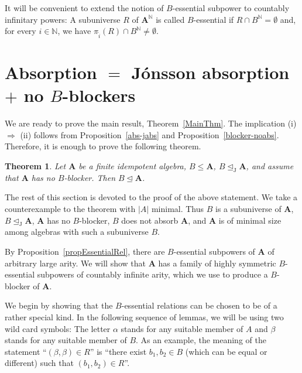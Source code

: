\documentclass{amsart}
\theoremstyle{plain}
\newtheorem{theorem}{Theorem}
\theoremstyle{definition}
\begin{document}
It will be convenient to extend the notion of $B$-essential subpower to countably infinitary powers:  A subuniverse $R$ of ${{\mathbf{A}}}^{{\mathbb N}}$ is called $B$-essential if $R\cap B^{{\mathbb N}}=\emptyset$ and, for every $i \in {{\mathbb N}}$, 
we have $\pi_{\widehat i} (R)\cap B^{{\mathbb N}}\neq \emptyset$. 

\section{Absorption $=$ J\'onsson absorption $+$ no $B$-blockers}

We are ready to prove the main result, Theorem~\ref{MainThm}.
The implication (i) $\Rightarrow$ (ii) follows from Proposition~\ref{abs-jabs} and Proposition~\ref{blocker-noabs}.
Therefore, it is enough to prove the following theorem. 

\begin{theorem}\label{thmAbsChar}
Let ${{\mathbf{A}}}$ be a finite idempotent algebra, $B\leq {{\mathbf{A}}}$, $B\operatorname{\trianglelefteq_J} {{\mathbf{A}}}$, and assume that ${{\mathbf{A}}}$ has no $B$-blocker. Then $B\operatorname{\trianglelefteq} {{\mathbf{A}}}$.
\end{theorem}
The rest of this section is devoted to the proof of the above statement. We take a counterexample to the theorem with $|A|$ minimal.
Thus $B$ is a subuniverse of ${{\mathbf{A}}}$, $B\operatorname{\trianglelefteq_J} {{\mathbf{A}}}$, ${{\mathbf{A}}}$ has no $B$-blocker, $B$ does not
absorb ${{\mathbf{A}}}$, and ${{\mathbf{A}}}$ is of minimal size among algebras with such a subuniverse $B$. 

By Proposition~\ref{propEssentialRel}, there are $B$-essential subpowers of
${{\mathbf{A}}}$ of arbitrary large arity. We will show that ${{\mathbf{A}}}$ has a family of
highly symmetric $B$-essential subpowers of countably infinite arity, which we
use to produce a $B$-blocker of ${{\mathbf{A}}}$.

We begin by showing that the $B$-essential relations can be chosen to be of a rather special kind. 
 In the
following sequence of lemmas, we will be using two wild card symbols: The letter
$\alpha$ stands for any suitable member of $A$ and $\beta$ stands for any
suitable member of $B$.
As an example, the meaning of the statement ``$(\beta,\beta)\in R$'' is ``there
exist $b_1,b_2\in B$ (which can be equal or different) such that $(b_1,b_2)\in R$''.
\end{document}
